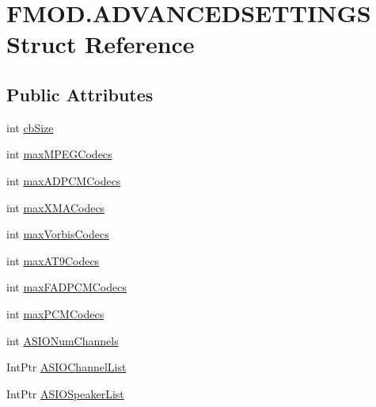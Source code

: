 \hypertarget{struct_f_m_o_d_1_1_a_d_v_a_n_c_e_d_s_e_t_t_i_n_g_s}{}\section{F\+M\+O\+D.\+A\+D\+V\+A\+N\+C\+E\+D\+S\+E\+T\+T\+I\+N\+GS Struct Reference}
\label{struct_f_m_o_d_1_1_a_d_v_a_n_c_e_d_s_e_t_t_i_n_g_s}
\subsection*{Public Attributes}
\begin{DoxyCompactItemize}
\item 
int \hyperlink{struct_f_m_o_d_1_1_a_d_v_a_n_c_e_d_s_e_t_t_i_n_g_s_a806a7ba729aaa41e926e7272eabe3d18}{cb\+Size}
\item 
int \hyperlink{struct_f_m_o_d_1_1_a_d_v_a_n_c_e_d_s_e_t_t_i_n_g_s_a478a2c58c0e3eb72d0a551bac6a85165}{max\+M\+P\+E\+G\+Codecs}
\item 
int \hyperlink{struct_f_m_o_d_1_1_a_d_v_a_n_c_e_d_s_e_t_t_i_n_g_s_aff15035cadb6d2b52f9e97bc7e24e977}{max\+A\+D\+P\+C\+M\+Codecs}
\item 
int \hyperlink{struct_f_m_o_d_1_1_a_d_v_a_n_c_e_d_s_e_t_t_i_n_g_s_a560c781141528c62d86adf857f1c6d5e}{max\+X\+M\+A\+Codecs}
\item 
int \hyperlink{struct_f_m_o_d_1_1_a_d_v_a_n_c_e_d_s_e_t_t_i_n_g_s_adb2535af2d16952bbbe4bf750e6377ee}{max\+Vorbis\+Codecs}
\item 
int \hyperlink{struct_f_m_o_d_1_1_a_d_v_a_n_c_e_d_s_e_t_t_i_n_g_s_aa256d4f87b7e8a31ddcce934c6d198ca}{max\+A\+T9\+Codecs}
\item 
int \hyperlink{struct_f_m_o_d_1_1_a_d_v_a_n_c_e_d_s_e_t_t_i_n_g_s_a839fd9084454db6b45a52c585e3e4c36}{max\+F\+A\+D\+P\+C\+M\+Codecs}
\item 
int \hyperlink{struct_f_m_o_d_1_1_a_d_v_a_n_c_e_d_s_e_t_t_i_n_g_s_a3439447a1350ca4ca445d9f77f09e7f1}{max\+P\+C\+M\+Codecs}
\item 
int \hyperlink{struct_f_m_o_d_1_1_a_d_v_a_n_c_e_d_s_e_t_t_i_n_g_s_a715fc87e893af78177f38a0b9d3296a3}{A\+S\+I\+O\+Num\+Channels}
\item 
Int\+Ptr \hyperlink{struct_f_m_o_d_1_1_a_d_v_a_n_c_e_d_s_e_t_t_i_n_g_s_a6a1178a0a59a4b6d0ecd0e55641f36aa}{A\+S\+I\+O\+Channel\+List}
\item 
Int\+Ptr \hyperlink{struct_f_m_o_d_1_1_a_d_v_a_n_c_e_d_s_e_t_t_i_n_g_s_a1dcb0803c1df6bcc926e1c3c56911486}{A\+S\+I\+O\+Speaker\+List}

\end{DoxyCompactItemize}
